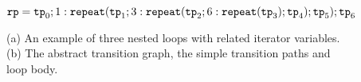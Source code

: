 \begin{figure}
$\mathtt{rp} = \mathtt{tp}_0; 1: \mathtt{repeat}(\mathtt{tp}_1; 3: {\mathtt{repeat}(\mathtt{tp}_2; 6 : {\mathtt{repeat}(\mathtt{tp}_3)}; \mathtt{tp}_4)}; \mathtt{tp}_5);\mathtt{tp}_6$
\vspace{-0.2cm}
\caption{
    (a) An example of three nested loops with related iterator variables.
    (b) The abstract transition graph, the simple transition paths and loop body.}
    \vspace{-0.8cm}
        \label{fig:threeWhile-overview}
    \end{figure}